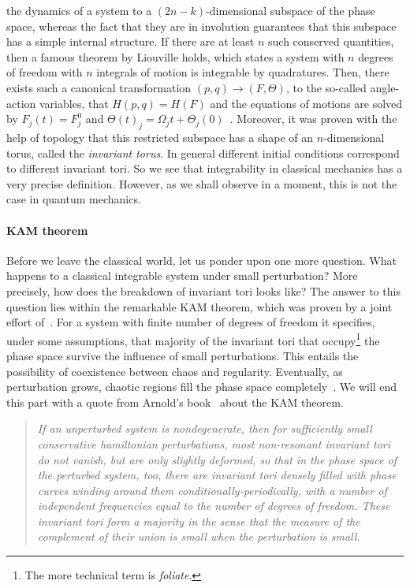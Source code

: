 the dynamics of a system to a \((2n-k)\)-dimensional subspace of the phase space, whereas the fact
that they are in involution guarantees that this subspace has a simple internal structure.
If there are at least \(n\) such conserved quantities, then a famous theorem by
Liouville holds, which states a system with \(n\) degrees of freedom with
\(n\) integrals of motion is integrable by quadratures.
Then, there exists such a canonical transformation \((p,q)\to (F,\Theta)\), to the
so-called angle-action variables, that \(H(p,q) = H(F)\) and the equations
of motions are solved by \(F_j(t) = F_j^0\) and \(\Theta(t)_j = \Omega_j t + \Theta_j(0)\)~\autocite{arnold2013mathematical}.
Moreover, it was proven with the help of topology that this restricted subspace
has a shape of an \(n\)-dimensional torus, called the \textit{invariant torus}. In
general different initial conditions correspond to different invariant tori.
So we see that integrability in classical mechanics has a very precise definition. However,
as we shall observe in a moment, this is not the case in quantum mechanics.

\paragraph{KAM theorem}Before we leave the classical world, let us ponder upon one more question.
What happens to a classical integrable system under small perturbation? More precisely,
how does the breakdown of invariant tori looks like? The answer to this question lies
within the remarkable KAM theorem, which was proven by a joint effort
of~\textcite{Kolmogorov1954,Moser1962,Arnold1963}. For
a system with finite number of degrees of freedom it specifies, under some assumptions,
that majority of the invariant tori that occupy\footnote{The more technical term is
\textit{foliate}.} the phase space survive the influence of small perturbations. This entails
the possibility of coexistence between chaos and regularity. Eventually, as perturbation grows,
chaotic regions fill the phase space completely~\autocite{DAlessio2016}. We will end this part
with a quote from Arnold's book~\autocite{arnold2013mathematical} about the KAM theorem.
\begin{quotation}
   \textit{ If an unperturbed system is nondegenerate, then for sufficiently
small conservative hamiltonian perturbations, most non-resonant invariant
tori do not vanish, but are only slightly deformed, so that in the phase space
of the perturbed system, too, there are invariant tori densely filled with phase
curves winding around them conditionally-periodically, with a number of
independent frequencies equal to the number of degrees of freedom.
These invariant tori form a majority in the sense that the measure of the
complement of their union is small when the perturbation is small.}
\end{quotation}
